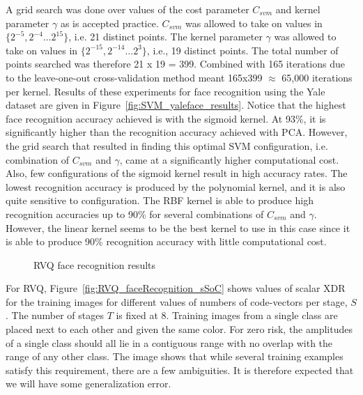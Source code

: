\begin{Body}
A grid search was done over values of the cost parameter $C_{svm}$ and kernel parameter $\gamma$ as is accepted practice.  $C_{svm}$ was allowed to take on values in $\{2^{-5}, 2^{-4} \ldots 2^{15}\}$, i.e. 21 distinct points.  The kernel parameter $\gamma$ was allowed to take on values in $\{2^{-15}, 2^{-14} \ldots 2^{3}\}$, i.e., 19 distinct points.  The total number of points searched was therefore 21 x 19 = 399.  Combined with 165 iterations due to the leave-one-out cross-validation method meant 165x399 $\approx$ 65,000 iterations per kernel.  Results of these experiments for face recognition using the Yale dataset are given in Figure~\ref{fig:SVM_yaleface_results}.  Notice that the highest face recognition accuracy achieved is with the sigmoid kernel.  At 93\%, it is significantly higher than the recognition accuracy achieved with PCA.  However, the grid search that resulted in finding this optimal SVM configuration, i.e. combination of $C_{svm}$ and $\gamma$, came at a significantly higher computational cost.  Also, few configurations of the sigmoid kernel result in high accuracy rates.  The lowest recognition accuracy is produced by the polynomial kernel, and it is also quite sensitive to configuration.  The RBF kernel is able to produce high recognition accuracies up to 90\% for several combinations of $C_{svm}$ and $\gamma$.  However, the linear kernel seems to be the best kernel to use in this case since it is able to produce 90\% recognition accuracy with little computational cost.

											\begin{figure}[t]
											\centering
											\caption{RVQ face recognition results}
											\label{fig:RVQ_yaleface_results}
											\end{figure}


For RVQ, Figure~\ref{fig:RVQ_faceRecognition_sSoC} shows values of scalar XDR for the training images for different values of numbers of code-vectors per stage, $S$.  The number of stages $T$ is fixed at 8.  Training images from a single class are placed next to each other and given the same color.  For zero risk, the amplitudes of a single class should all lie in a contiguous range with no overlap with the range of any other class.  The image shows that while several training examples satisfy this requirement, there are a few ambiguities.  It is therefore expected that we will have some generalization error.


\end{Body}
